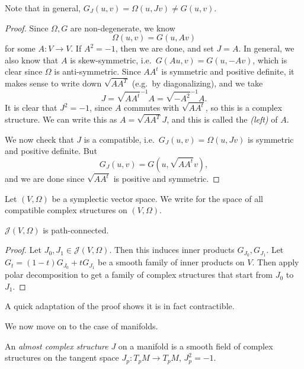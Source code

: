 \documentclass[a4paper]{article}
\begin{document}
Note that in general, $G_J(u, v) = \Omega(u, Jv) \not= G(u, v)$.
\begin{proof}
  Since $\Omega, G$ are non-degenerate, we know
  \[
    \Omega(u, v) = G(u, Av)
  \]
  for some $A: V \to V$. If $A^2 = -1$, then we are done, and set $J = A$. In general, we also know that $A$ is skew-symmetric, i.e.\ $G(Au, v) = G(u, -Av)$, which is clear since $\Omega$ is anti-symmetric. Since $AA^t$ is symmetric and positive definite, it makes sense to write down $\sqrt{AA^T}$ (e.g.\ by diagonalizing), and we take
  \[
    J = \sqrt{AA^t}^{-1} A = \sqrt{-A^2}^{-1} A.
  \]
  It is clear that $J^2 = -1$, since $A$ commutes with $\sqrt{AA^t}$, so this is a complex structure. We can write this as $A = \sqrt{AA^T} J$, and this is called the \emph{(left)}  of $A$.

  We now check that $J$ is a compatible, i.e.\ $G_J(u, v) = \Omega(u, Jv)$ is symmetric and positive definite. But
  \[
    G_J(u, v) = G(u, \sqrt{AA^t}v),
  \]
  and we are done since $\sqrt{AA^t}$ is positive and symmetric.
\end{proof}

\begin{notation}
  Let $(V, \Omega)$ be a symplectic vector space. We write  for the space of all compatible complex structures on $(V, \Omega)$.
\end{notation}

\begin{prop}
  $\mathcal{J}(V, \Omega)$ is path-connected.
\end{prop}

\begin{proof}
  Let $J_0, J_1 \in \mathcal{J}(V, \Omega)$. Then this induces inner products $G_{J_0}, G_{J_1}$. Let $G_t = (1 - t) G_{J_0} + t G_{J_1}$ be a smooth family of inner products on $V$. Then apply polar decomposition to get a family of complex structures that start from $J_0$ to $J_1$.
\end{proof}
A quick adaptation of the proof shows it is in fact contractible.

We now move on to the case of manifolds.

\begin{defi}
  An \emph{almost complex structure} $J$ on a manifold is a smooth field of complex structures on the tangent space $J_p: T_p M \to T_p M$, $J_p^2 = -1$.
\end{defi}
\end{document}
